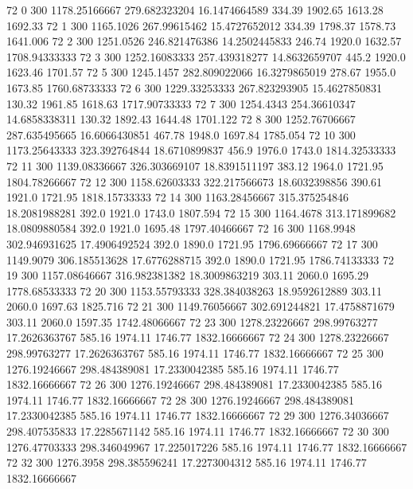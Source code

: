 72  0  300  1178.25166667  279.682323204  16.1474664589  334.39  1902.65  1613.28  1692.33 
72  1  300  1165.1026  267.99615462  15.4727652012  334.39  1798.37  1578.73  1641.006 
72  2  300  1251.0526  246.821476386  14.2502445833  246.74  1920.0  1632.57  1708.94333333 
72  3  300  1252.16083333  257.439318277  14.8632659707  445.2  1920.0  1623.46  1701.57 
72  5  300  1245.1457  282.809022066  16.3279865019  278.67  1955.0  1673.85  1760.68733333 
72  6  300  1229.33253333  267.823293905  15.4627850831  130.32  1961.85  1618.63  1717.90733333 
72  7  300  1254.4343  254.36610347  14.6858338311  130.32  1892.43  1644.48  1701.122 
72  8  300  1252.76706667  287.635495665  16.6066430851  467.78  1948.0  1697.84  1785.054 
72  10  300  1173.25643333  323.392764844  18.6710899837  456.9  1976.0  1743.0  1814.32533333 
72  11  300  1139.08336667  326.303669107  18.8391511197  383.12  1964.0  1721.95  1804.78266667 
72  12  300  1158.62603333  322.217566673  18.6032398856  390.61  1921.0  1721.95  1818.15733333 
72  14  300  1163.28456667  315.375254846  18.2081988281  392.0  1921.0  1743.0  1807.594 
72  15  300  1164.4678  313.171899682  18.0809880584  392.0  1921.0  1695.48  1797.40466667 
72  16  300  1168.9948  302.946931625  17.4906492524  392.0  1890.0  1721.95  1796.69666667 
72  17  300  1149.9079  306.185513628  17.6776288715  392.0  1890.0  1721.95  1786.74133333 
72  19  300  1157.08646667  316.982381382  18.3009863219  303.11  2060.0  1695.29  1778.68533333 
72  20  300  1153.55793333  328.384038263  18.9592612889  303.11  2060.0  1697.63  1825.716 
72  21  300  1149.76056667  302.691244821  17.4758871679  303.11  2060.0  1597.35  1742.48066667 
72  23  300  1278.23226667  298.99763277  17.2626363767  585.16  1974.11  1746.77  1832.16666667 
72  24  300  1278.23226667  298.99763277  17.2626363767  585.16  1974.11  1746.77  1832.16666667 
72  25  300  1276.19246667  298.484389081  17.2330042385  585.16  1974.11  1746.77  1832.16666667 
72  26  300  1276.19246667  298.484389081  17.2330042385  585.16  1974.11  1746.77  1832.16666667 
72  28  300  1276.19246667  298.484389081  17.2330042385  585.16  1974.11  1746.77  1832.16666667 
72  29  300  1276.34036667  298.407535833  17.2285671142  585.16  1974.11  1746.77  1832.16666667 
72  30  300  1276.47703333  298.346049967  17.225017226  585.16  1974.11  1746.77  1832.16666667 
72  32  300  1276.3958  298.385596241  17.2273004312  585.16  1974.11  1746.77  1832.16666667 

